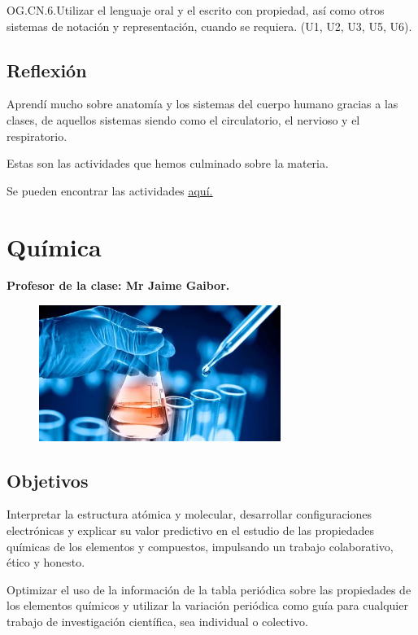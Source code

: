 \documentclass[a4paper, 12pt]{article}
\begin{document}
OG.CN.6.Utilizar el lenguaje oral y el escrito con propiedad, así como otros sistemas de notación y representación, cuando se requiera. (U1, U2, U3, U5, U6).

\subsection{Reflexión}
Aprendí mucho sobre anatomía y los sistemas del cuerpo humano gracias a las clases, de aquellos sistemas siendo como el circulatorio, el nervioso y el respiratorio.

Estas son las actividades que hemos culminado sobre la materia.

Se pueden encontrar las actividades \href{https://drive.google.com/drive/folders/1YKD8CT8OZtmeYhkY7_T-5Bcr-CvnnMNm?usp=sharing}{\underline{aquí.}}

\section{Química}
\textbf{Profesor de la clase: Mr Jaime Gaibor.}

\begin{figure}[h]
  \includegraphics[width=0.7\textwidth, center]{quimica.jpeg}
\end{figure}

\subsection{Objetivos}
Interpretar la estructura atómica y molecular, desarrollar configuraciones electrónicas y explicar su valor predictivo en el estudio de las propiedades químicas de los elementos y compuestos, impulsando un trabajo colaborativo, ético y honesto.

Optimizar el uso de la información de la tabla periódica sobre las propiedades de los elementos químicos y utilizar la variación periódica como guía para cualquier trabajo de investigación científica, sea individual o colectivo.
\end{document}
